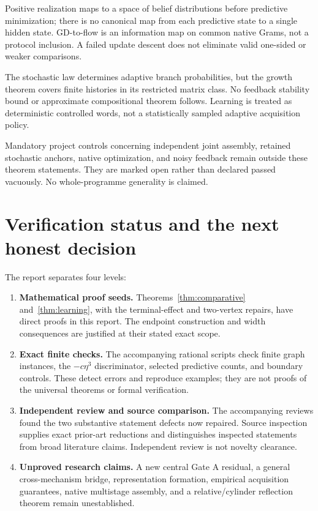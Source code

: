 \documentclass[11pt]{article}
\theoremstyle{remark}
\begin{document}
\begin{description}[style=nextline,leftmargin=0pt]
\item[Comparison direction]
Positive realization maps to a space of belief distributions before predictive minimization; there is no canonical map from each predictive state to a single hidden state. GD-to-flow is an information map on common native Grams, not a protocol inclusion. A failed update descent does not eliminate valid one-sided or weaker comparisons.
\item[Feedback and approximate claims]
The stochastic law determines adaptive branch probabilities, but the growth theorem covers finite histories in its restricted matrix class. No feedback stability bound or approximate compositional theorem follows. Learning is treated as deterministic controlled words, not a statistically sampled adaptive acquisition policy.
\end{description}

Mandatory project controls concerning independent joint assembly, retained stochastic anchors, native optimization, and noisy feedback remain outside these theorem statements. They are marked open rather than declared passed vacuously. No whole-programme generality is claimed.

\section{Verification status and the next honest decision}
\label{sec:status}

The report separates four levels:
\begin{enumerate}
\item \textbf{Mathematical proof seeds.} Theorems~\ref{thm:comparative} and~\ref{thm:learning}, with the terminal-effect and two-vertex repairs, have direct proofs in this report. The endpoint construction and width consequences are justified at their stated exact scope.
\item \textbf{Exact finite checks.} The accompanying rational scripts check finite graph instances, the $-c\eta^3$ discriminator, selected predictive counts, and boundary controls. These detect errors and reproduce examples; they are not proofs of the universal theorems or formal verification.
\item \textbf{Independent review and source comparison.} The accompanying reviews found the two substantive statement defects now repaired. Source inspection supplies exact prior-art reductions and distinguishes inspected statements from broad literature claims. Independent review is not novelty clearance.
\item \textbf{Unproved research claims.} A new central Gate A residual, a general cross-mechanism bridge, representation formation, empirical acquisition guarantees, native multistage assembly, and a relative/cylinder reflection theorem remain unestablished.
\end{enumerate}
\end{document}
